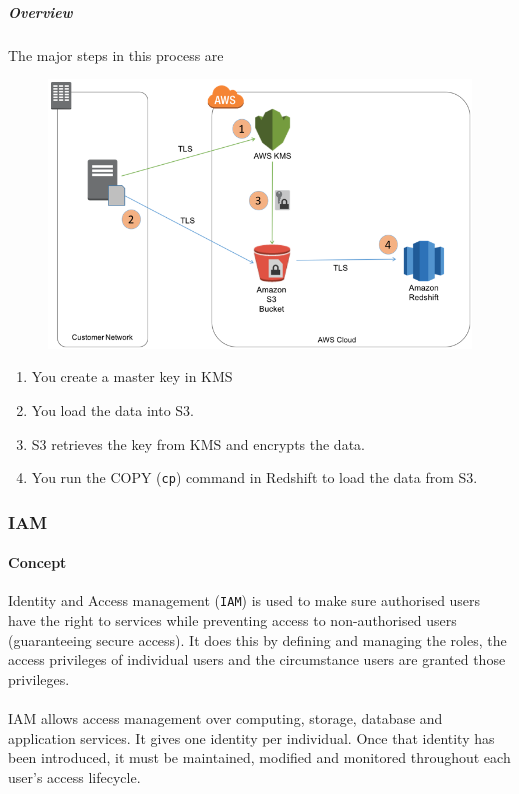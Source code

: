 \documentclass[10pt]{article}
\begin{document}
\begin{samepage}
\subparagraph{Overview} 
The major steps in this process are
\begin{figure}[h!]
	\centering
	\includegraphics[width=0.7\linewidth]{images/EcryptionOverview.PNG}	
\end{figure}
\nopagebreak
\begin{enumerate}
  \item You create a master key in KMS
  \item You load the data into S3.
  \item S3 retrieves the key from KMS and encrypts the data.
  \item You run the COPY (\texttt{cp}) command in Redshift to load the data from S3.
\end{enumerate}
\end{samepage}

\subsubsection{IAM}
\paragraph{Concept}
Identity and Access management (\texttt{IAM}) is used to make sure authorised users have the right to services while preventing access to non-authorised users (guaranteeing secure access). It does this by defining and managing the roles, the access privileges of individual users and the circumstance users are granted those privileges.
\\ \\
IAM allows access management over computing, storage, database and application services. It gives one identity per individual. Once that identity has been introduced, it must be maintained, modified and monitored throughout each user’s access lifecycle. \cite{iam}
\end{document}
